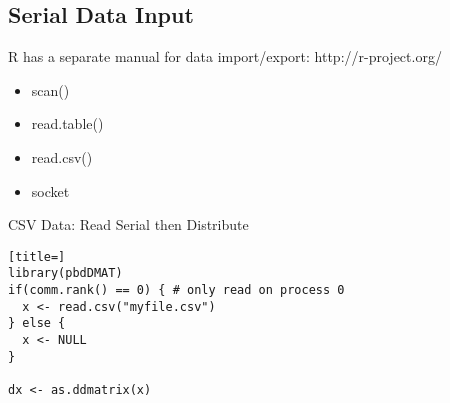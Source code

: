 \subsection{Serial Data Input}
\makesubcontentsslidessec


\begin{frame}
\begin{block}{R has a separate manual for data import/export: http://r-project.org/}
\begin{itemize}
\item scan()
\item read.table()
\item read.csv()
\item socket
\end{itemize}
\end{block}
\end{frame}

\begin{frame}[fragile]
  \begin{exampleblock}{CSV Data: Read Serial then Distribute}\pause
\begin{lstlisting}[title=]
library(pbdDMAT)
if(comm.rank() == 0) { # only read on process 0
  x <- read.csv("myfile.csv")
} else {
  x <- NULL
}

dx <- as.ddmatrix(x)
\end{lstlisting}
  \end{exampleblock}
\end{frame}
